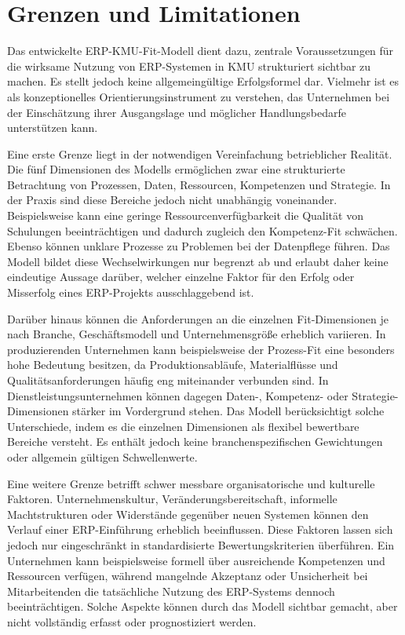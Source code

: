 \section{Grenzen und Limitationen}

Das entwickelte ERP-KMU-Fit-Modell dient dazu, zentrale Voraussetzungen für die wirksame Nutzung von ERP-Systemen in 
KMU strukturiert sichtbar zu machen. Es stellt jedoch keine allgemeingültige Erfolgsformel dar. Vielmehr ist es als 
konzeptionelles Orientierungsinstrument zu verstehen, das Unternehmen bei der Einschätzung ihrer Ausgangslage und 
möglicher Handlungsbedarfe unterstützen kann.

Eine erste Grenze liegt in der notwendigen Vereinfachung betrieblicher Realität. Die fünf Dimensionen des Modells 
ermöglichen zwar eine strukturierte Betrachtung von Prozessen, Daten, Ressourcen, Kompetenzen und Strategie. In der 
Praxis sind diese Bereiche jedoch nicht unabhängig voneinander. Beispielsweise kann eine geringe Ressourcenverfügbarkeit 
die Qualität von Schulungen beeinträchtigen und dadurch zugleich den Kompetenz-Fit schwächen. Ebenso können unklare 
Prozesse zu Problemen bei der Datenpflege führen. Das Modell bildet diese Wechselwirkungen nur begrenzt ab und erlaubt 
daher keine eindeutige Aussage darüber, welcher einzelne Faktor für den Erfolg oder Misserfolg eines ERP-Projekts 
ausschlaggebend ist.

Darüber hinaus können die Anforderungen an die einzelnen Fit-Dimensionen je nach Branche, Geschäftsmodell und Unternehmensgröße 
erheblich variieren. In produzierenden Unternehmen kann beispielsweise der Prozess-Fit eine besonders hohe Bedeutung besitzen, 
da Produktionsabläufe, Materialflüsse und Qualitätsanforderungen häufig eng miteinander verbunden sind. In Dienstleistungsunternehmen 
können dagegen Daten-, Kompetenz- oder Strategie-Dimensionen stärker im Vordergrund stehen. Das Modell berücksichtigt solche 
Unterschiede, indem es die einzelnen Dimensionen als flexibel bewertbare Bereiche versteht. Es enthält jedoch keine 
branchenspezifischen Gewichtungen oder allgemein gültigen Schwellenwerte.

Eine weitere Grenze betrifft schwer messbare organisatorische und kulturelle Faktoren. Unternehmenskultur, Veränderungsbereitschaft, 
informelle Machtstrukturen oder Widerstände gegenüber neuen Systemen können den Verlauf einer ERP-Einführung erheblich beeinflussen. 
Diese Faktoren lassen sich jedoch nur eingeschränkt in standardisierte Bewertungskriterien überführen. Ein Unternehmen kann 
beispielsweise formell über ausreichende Kompetenzen und Ressourcen verfügen, während mangelnde Akzeptanz oder Unsicherheit 
bei Mitarbeitenden die tatsächliche Nutzung des ERP-Systems dennoch beeinträchtigen. Solche Aspekte können durch das Modell 
sichtbar gemacht, aber nicht vollständig erfasst oder prognostiziert werden.

